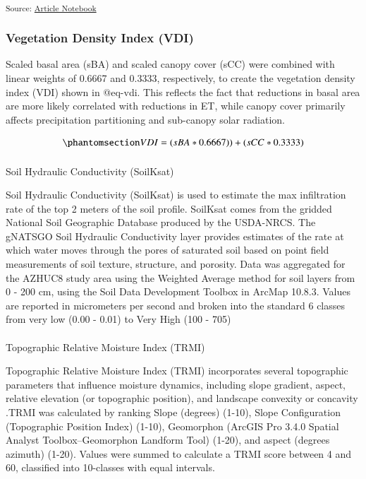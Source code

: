 \documentclass[
  number,
  preprint,
  3p,
  onecolumn]{elsarticle}
\makeatletter
\let\oldparagraph\paragraph
\renewcommand{\paragraph}{
    \@ifstar
      \xxxParagraphStar
      \xxxParagraphNoStar
  }
\newcommand{\xxxParagraphStar}[1]{\oldparagraph*{#1}\mbox{}}
\newcommand{\xxxParagraphNoStar}[1]{\oldparagraph{#1}\mbox{}}
\makeatother
\begin{document}
\textsubscript{Source:
\href{https://Ryan3Lima.github.io/ATUR-Thinning-to-enhance-recharge/index.qmd.html}{Article
Notebook}}

\subsubsection{Vegetation Density Index
(VDI)}\label{vegetation-density-index-vdi}

Scaled basal area (sBA) and scaled canopy cover (sCC) were combined with
linear weights of 0.6667 and 0.3333, respectively, to create the
vegetation density index (VDI) shown in @eq-vdi. This reflects the fact
that reductions in basal area are more likely correlated with reductions
in ET, while canopy cover primarily affects precipitation partitioning
and sub-canopy solar radiation.

\begin{equation}\phantomsection\label{eq-vdi}{
VDI  = ( sBA* 0.6667)) + (sCC * 0.3333)
}\end{equation}

\paragraph{Soil Hydraulic Conductivity
(SoilKsat)}\label{soil-hydraulic-conductivity-soilksat}

Soil Hydraulic Conductivity (SoilKsat) is used to estimate the max
infiltration rate of the top 2 meters of the soil profile. SoilKsat
comes from the gridded National Soil Geographic Database produced by the
USDA-NRCS. The gNATSGO Soil Hydraulic Conductivity layer provides
estimates of the rate at which water moves through the pores of
saturated soil based on point field measurements of soil texture,
structure, and porosity. Data was aggregated for the AZHUC8 study area
using the Weighted Average method for soil layers from 0 - 200 cm, using
the Soil Data Development Toolbox in ArcMap 10.8.3. Values are reported
in micrometers per second and broken into the standard 6 classes from
very low (0.00 - 0.01) to Very High (100 - 705)

\paragraph{Topographic Relative Moisture Index
(TRMI)}\label{topographic-relative-moisture-index-trmi}

Topographic Relative Moisture Index (TRMI) incorporates several
topographic parameters that influence moisture dynamics, including slope
gradient, aspect, relative elevation (or topographic position), and
landscape convexity or concavity \citep{parker1982}.TRMI was calculated
by ranking Slope (degrees) (1-10), Slope Configuration (Topographic
Position Index) (1-10), Geomorphon (ArcGIS Pro 3.4.0 Spatial Analyst
Toolbox--Geomorphon Landform Tool) (1-20), and aspect (degrees azimuth)
(1-20). Values were summed to calculate a TRMI score between 4 and 60,
classified into 10-classes with equal intervals.
\end{document}
